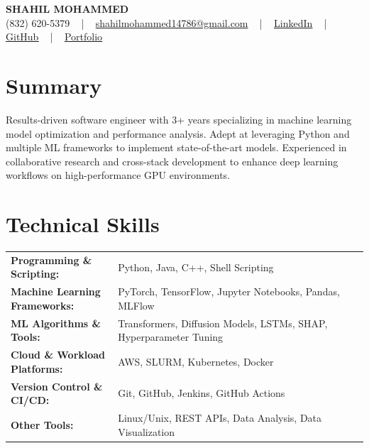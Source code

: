 \documentclass[letterpaper,11pt]{article}
\begin{document}
\begin{center}
    {\fontsize{14pt}{12pt}\selectfont \textbf{\MakeUppercase{Shahil Mohammed}}}\\ \vspace{2pt}
    \fontsize{10pt}{12pt}\selectfont (832) 620-5379 ~ | ~ \href{mailto:shahilmohammed14786@gmail.com}{shahilmohammed14786@gmail.com} ~ | ~  
    \href{https://www.linkedin.com/in/shahil-mohammed-9652931a1/}{\color{blue}\underline{LinkedIn}}  ~ | ~ 
    \href{https://github.com/freakbeast14}{\color{blue}\underline{GitHub}} ~ | ~ 
    \href{https://shahil-mohammed.netlify.app/}{\color{blue}\underline{Portfolio}}
    \vspace{-8pt}
\end{center}

\section{Summary}
\fontsize{9pt}{10pt}\selectfont
Results-driven software engineer with 3+ years specializing in machine learning model optimization and performance analysis. Adept at leveraging Python and multiple ML frameworks to implement state-of-the-art models. Experienced in collaborative research and cross-stack development to enhance deep learning workflows on high-performance GPU environments.

 \vspace{-5pt}
 
\section{Technical Skills}
        \vspace{-14pt}
        \begin{table}[h]
            \fontsize{9pt}{10pt}\selectfont
            \begin{tabular}{p{0.3\linewidth} p{0.7\linewidth}}
                \textbf{Programming \& Scripting:} & Python, Java, C++, Shell Scripting \\
                \textbf{Machine Learning Frameworks:} & PyTorch, TensorFlow, Jupyter Notebooks, Pandas, MLFlow \\
                \textbf{ML Algorithms \& Tools:} & Transformers, Diffusion Models, LSTMs, SHAP, Hyperparameter Tuning \\
                \textbf{Cloud \& Workload Platforms:} & AWS, SLURM, Kubernetes, Docker \\
                \textbf{Version Control \& CI/CD:} & Git, GitHub, Jenkins, GitHub Actions \\
                \textbf{Other Tools:} & Linux/Unix, REST APIs, Data Analysis, Data Visualization \\
            \end{tabular}
        \end{table}
 \vspace{-15pt}
 
\end{document}
